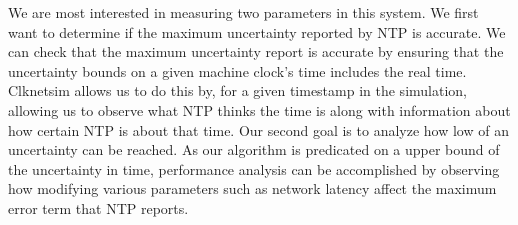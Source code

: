 We are most interested in measuring two parameters in
this system. We first want to determine if the maximum uncertainty
reported by NTP is accurate. We can check that the maximum uncertainty
report is accurate by ensuring that the uncertainty bounds on a given machine
clock's time includes the real time.
Clknetsim allows us to do this by, for a
given timestamp in the simulation, allowing us to observe what NTP
thinks the time is along with information about how certain NTP is
about that time. Our second goal is to analyze how low of an
uncertainty can be reached. As our algorithm is predicated on a upper
bound of the uncertainty in time, performance analysis can be
accomplished by observing how modifying various parameters such as
network latency affect the maximum error term that NTP reports.


